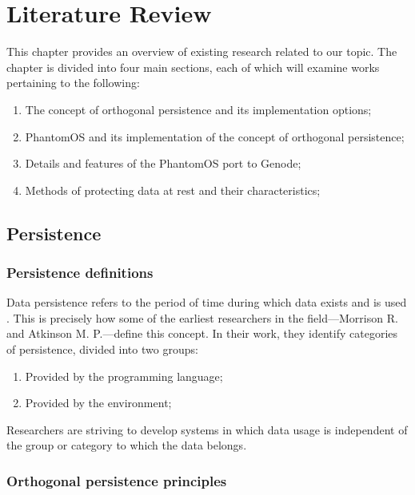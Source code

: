 \chapter{Literature Review}
\label{chap:lr}

This chapter provides an overview of existing research related to our topic. The chapter is divided into four main sections, each of which will examine works pertaining to the following:
\begin{enumerate}[label=\textbf{Section \arabic*:}, leftmargin=*]
  \item The concept of orthogonal persistence and its implementation options;
  \item PhantomOS and its implementation of the concept of orthogonal persistence;
  \item Details and features of the PhantomOS port to Genode;
  \item Methods of protecting data at rest and their characteristics;
\end{enumerate}

\section{Persistence}

\subsection{Persistence definitions}

Data persistence refers to the period of time during which data exists and is used \cite{PLA}. This is precisely how some of the earliest researchers in the field—Morrison R. and Atkinson M. P.—define this concept. In their work, they identify categories of persistence, divided into two groups: 
\begin{enumerate}[label=\arabic*.]
  \item Provided by the programming language;
  \item Provided by the environment;
\end{enumerate}
Researchers are striving to develop systems in which data usage is independent of the group or category to which the data belongs. 


\subsection{Orthogonal persistence principles}

